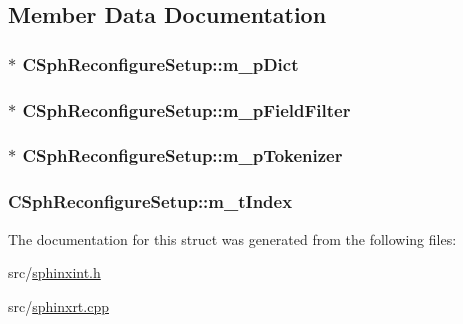 \subsection{Member Data Documentation}
\hypertarget{structCSphReconfigureSetup_a9342e258273181c7a3f25dc94c6e4311}{
\subsubsection[{m\-\_\-p\-Dict}]{$\ast$ C\-Sph\-Reconfigure\-Setup\-::m\-\_\-p\-Dict}}\label{structCSphReconfigureSetup_a9342e258273181c7a3f25dc94c6e4311}
\hypertarget{structCSphReconfigureSetup_a3abf8b015e73fd1cb3e62207f5fef7af}{
\subsubsection[{m\-\_\-p\-Field\-Filter}]{$\ast$ C\-Sph\-Reconfigure\-Setup\-::m\-\_\-p\-Field\-Filter}}\label{structCSphReconfigureSetup_a3abf8b015e73fd1cb3e62207f5fef7af}
\hypertarget{structCSphReconfigureSetup_a3faa40e8b11f5a9da8767f461cb77a1e}{
\subsubsection[{m\-\_\-p\-Tokenizer}]{$\ast$ C\-Sph\-Reconfigure\-Setup\-::m\-\_\-p\-Tokenizer}}\label{structCSphReconfigureSetup_a3faa40e8b11f5a9da8767f461cb77a1e}
\hypertarget{structCSphReconfigureSetup_a35bd6922278066b38e4ec7f5f833a729}{
\subsubsection[{m\-\_\-t\-Index}]{ C\-Sph\-Reconfigure\-Setup\-::m\-\_\-t\-Index}}\label{structCSphReconfigureSetup_a35bd6922278066b38e4ec7f5f833a729}


The documentation for this struct was generated from the following files\-:\begin{DoxyCompactItemize}
\item 
src/\hyperlink{sphinxint_8h}{sphinxint.\-h}\item 
src/\hyperlink{sphinxrt_8cpp}{sphinxrt.\-cpp}\end{DoxyCompactItemize}
